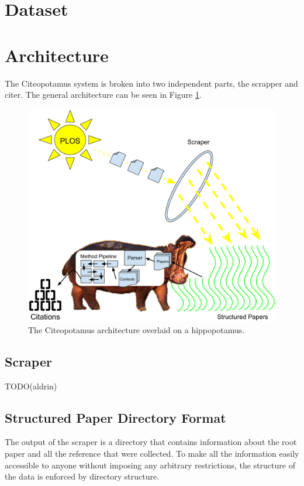 \documentclass[10pt, conference, compsocconf]{IEEEtran}
\begin{document}
\section{Dataset}\label{sec:dataset}

\section{Architecture}\label{sec:architecture}
The Citeopotamus system is broken into two independent parts, the scrapper and citer.
The general architecture can be seen in Figure \ref{fig:arch}.

\begin{figure}[ht]
   \includegraphics[width=\textwidth px]{images/arch.eps}
        \caption{The Citeopotamus architecture overlaid on a hippopotamus.}
        \label{fig:arch}
\end{figure}

\subsection{Scraper}
TODO(aldrin)

\subsection{Structured Paper Directory Format}
The output of the scraper is a directory that contains information about the root paper and all the reference that were collected.
To make all the information easily accessible to anyone without imposing any arbitrary restrictions, the structure of the
data is enforced by directory structure.
\end{document}
